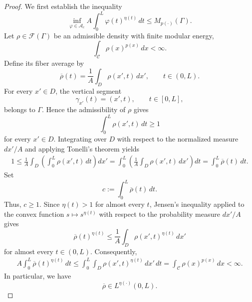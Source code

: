 \documentclass[12pt]{amsart}
\numberwithin{equation}{section}
\theoremstyle{plain}
\theoremstyle{definition}
\begin{document}
\begin{proof}
We first establish the inequality
\begin{equation}
\label{eq:cylinder_lower_bound}
\inf_{\varphi\in\mathcal A_c}
A\int_0^L\varphi(t)^{\eta(t)}\,dt
\le
M_{p(\cdot)}(\Gamma).
\end{equation}
Let $\rho\in\mathcal F(\Gamma)$ be an admissible density with finite
modular energy,
\begin{equation*}
\int_{\mathcal C}\rho(x)^{p(x)}\,dx<\infty.
\end{equation*}
Define its fiber average by
\begin{equation}
\label{eq:cylinder_fiber_average}
\overline\rho(t)
=
\frac{1}{A}\int_D\rho(x',t)\,dx',
\qquad t\in(0,L).
\end{equation}
For every $x'\in D$, the vertical segment
\begin{equation*}
\gamma_{x'}(t)=(x',t),
\qquad t\in[0,L],
\end{equation*}
belongs to $\Gamma$. Hence the admissibility of $\rho$ gives
\begin{equation*}
\int_0^L\rho(x',t)\,dt\ge1
\end{equation*}
for every $x'\in D$.
Integrating over $D$ with respect to the normalized measure
$dx'/A$ and applying Tonelli's theorem yields
\begin{align}
1
\le
\frac1A\int_D
\left(\int_0^L\rho(x',t)\,dt\right)dx'
=
\int_0^L
\left(\frac1A\int_D\rho(x',t)\,dx'\right)dt
=
\int_0^L\overline\rho(t)\,dt.
\label{eq:cylinder_average_constraint}
\end{align}
Set
\begin{equation*}
c:=\int_0^L\overline\rho(t)\,dt.
\end{equation*}
Thus, $c\ge1$.
Since $\eta(t)>1$ for almost every $t$, Jensen's inequality applied
to the convex function $s\mapsto s^{\eta(t)}$ with respect to the
probability measure $dx'/A$ gives
\begin{equation}
\label{eq:cylinder_jensen}
\overline\rho(t)^{\eta(t)}
\le
\frac1A\int_D
\rho(x',t)^{\eta(t)}\,dx'
\end{equation}
for almost every $t\in(0,L)$.
Consequently,
\begin{align}
A\int_0^L\overline\rho(t)^{\eta(t)}\,dt
\le
\int_0^L\int_D
\rho(x',t)^{\eta(t)}\,dx'\,dt
=
\int_{\mathcal C}\rho(x)^{p(x)}\,dx
<\infty.
\label{eq:cylinder_energy_average}
\end{align}
In particular, we have
\begin{equation*}
\overline\rho\in L^{\eta(\cdot)}(0,L).
\end{equation*}


\end{proof}
\end{document}
